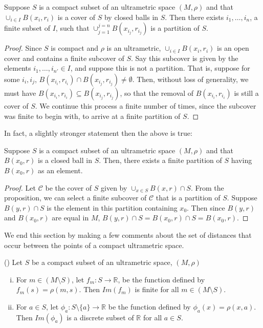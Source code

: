 \begin{proposition}
Suppose $S$ is a compact subset of an ultrametric space $(M, \rho)$ and that $\cup_{i \in I} B(x_i,r_i)$ is a cover of $S$ by closed balls in $S$. Then there exists $i_1,\ldots, i_n$, a finite subset of $I$, such that  $\cup_{j=1}^{j=n} B(x_{i_j},r_{i_j})$ is a partition of $S$.
\end{proposition}

\begin{proof}
Since $S$ is compact and $\rho$ is an ultrametric, $\cup_{i \in I} B(x_i,r_i)$ is an open cover and contains a finite subcover of $S$. Say this subcover is given by the elements  $i_1,\ldots, i_{n'} \in I$, and suppose this is not a partition. That is, suppose for some $i_i, i_j$, $ B(x_{i_i},r_{i_i}) \cap  B(x_{i_j},r_{i_j}) \neq \emptyset$. Then, without loss of generality, we must have $ B(x_{i_i},r_{i_i}) \subseteq  B(x_{i_j},r_{i_j})$, so that the removal of $ B(x_{i_i},r_{i_i})$ is still a cover of $S$. We continue this process a finite number of times, since the subcover was finite to begin with, to arrive at a finite partition of $S$.
\end{proof}

In fact, a slightly stronger statement then the above is true:\\

\begin{corollary}
Suppose $S$ is a compact subset of an ultrametric space $(M, \rho)$ and that $B(x_0,r)$ is a closed ball in $S$. Then, there exists a finite partition of $S$ having $B(x_0,r)$ as an element.
\end{corollary}

\begin{proof}
Let $\mathcal{C}$ be the cover of $S$ given by $\cup_{x\in S} B(x,r) \cap S$. From the proposition, we can select a finite subcover of $\mathcal{C}$ that is a partition of $S$. Suppose $B(y,r) \cap S$ is the element in this partition containing $x_0$. Then  since $B(y,r)$ and $B(x_0,r)$ are equal in $M$, $B(y,r) \cap S = B(x_0,r) \cap S = B(x_0,r)$.
\end{proof}

We end this section by making a few comments about the set of distances that occur between the points of a compact ultrametric space.\\

\begin{proposition}
(\cite{ar}) Let $S$ be a compact subset of an ultrametric space, $(M, \rho)$
\begin{enumerate}[(i)]
\item For $m \in (M \setminus S)$, let $f_m:S \rightarrow \mathbb{R}$, be the function defined by $f_m(s) = \rho(m,s)$. Then $Im(f_m)$ is finite for all $m \in (M \setminus S)$.
\item For $a \in S$, let $\phi_a: S \setminus \{a\} \rightarrow \mathbb{R}$ be the function defined by $\phi_a(x)=\rho(x,a)$. Then $Im(\phi_a)$ is a discrete subset of $\mathbb{R}$ for all $a \in S$.
\end{enumerate}
\end{proposition}

